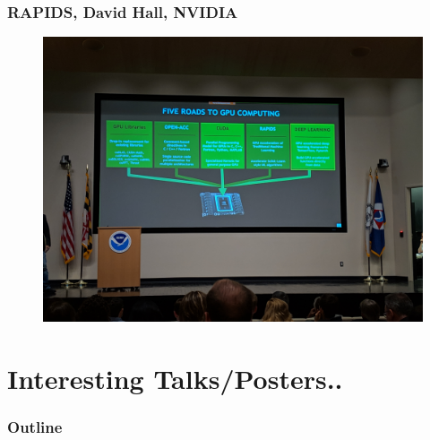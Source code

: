 \documentclass{beamer}
\begin{document}
\begin{frame}
\frametitle{RAPIDS, David Hall, NVIDIA}
\begin{figure}
	\includegraphics[width=\linewidth]{figs/IMG_20190423_124704.jpg}
\end{figure}
\end{frame}

\section{Interesting Talks/Posters..}

\begin{frame}
\frametitle{Outline} %
\tableofcontents[currentsection] %
\end{frame}
%
\end{document}
